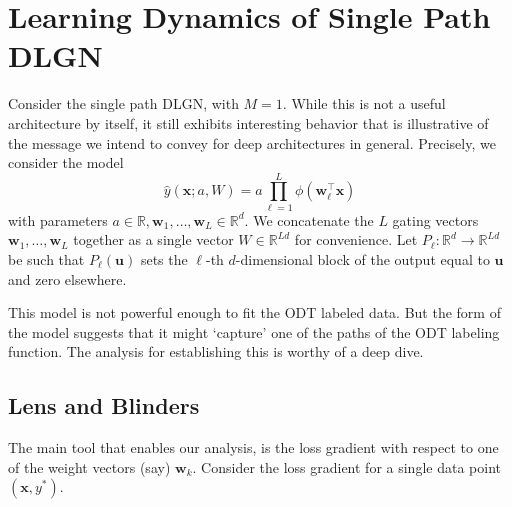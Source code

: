 \documentclass{article}
\theoremstyle{plain}
\theoremstyle{definition}
\theoremstyle{remark}
\newcommand{\R}{{\mathbb R}}
\newcommand{\1}{{\mathbf 1}}
\newcommand{\0}{{\mathbf 0}}
\newcommand{\w}{{\mathbf w}}
\newcommand{\x}{{\mathbf x}}
\newcommand{\bu}{{\mathbf u}}
\renewcommand{\>}{{\rightarrow}}
\begin{document}





\section{Learning Dynamics of Single Path DLGN}
\label{sec:single-path-DLGN}
Consider the single path DLGN, with $M=1$. While this is not a useful architecture by itself, it still exhibits interesting behavior that is illustrative of the message we intend to convey for deep architectures in general. Precisely, we consider the model
\[
\hat y(\x; a, W) = a \prod_{\ell =1}^L \phi(\w_\ell ^\top \x)
\]
with parameters $a \in \R, \w_1 , \ldots, \w_L \in \R^d$. We concatenate the $L$ gating vectors $\w_1, \ldots, \w_L$ together as a single vector $W \in \R^{Ld}$ for convenience. Let $P_\ell:\R^d \>\R^{Ld}$ be such that $P_\ell(\bu)$ sets the $\ell$-th $d$-dimensional block of the output equal to $\bu$ and zero elsewhere. %

This model is not powerful enough to fit the ODT labeled data. But the form of the model suggests that it might `capture' one of the paths of the ODT labeling function. The analysis for establishing this is worthy of a deep dive.

\subsection{Lens and Blinders}
The main tool that enables our analysis, is the loss gradient with respect to one of the weight vectors (say) $\w_k$. Consider the loss gradient for a single data point $(\x,y^*)$. 
\end{document}
